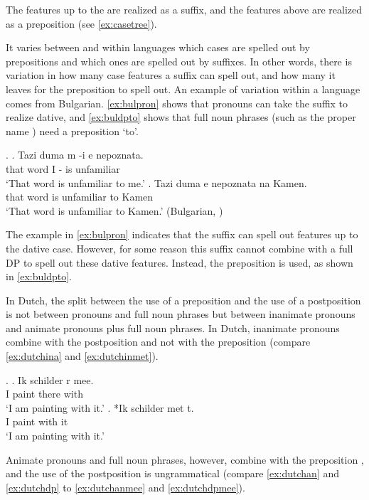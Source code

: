 \documentclass[11pt,a4paper]{article}
\begin{document}
The features up to the  are realized as a suffix, and the features above  are realized as a preposition (see \ref{ex:casetree}).

It varies between and within languages which cases are spelled out by prepositions and which ones are spelled out by suffixes. In other words, there is variation in how many case features a suffix can spell out, and how many it leaves for the preposition to spell out. An example of variation within a language comes from Bulgarian. \ref{ex:bulpron} shows that pronouns can take the suffix  to realize dative, and \ref{ex:buldpto} shows that full noun phrases (such as the proper name ) need a preposition  `to'.

\ex.\label{ex:bulgarian}
\ag. Tazi duma m -i e nepoznata.\\
that word I - is unfamiliar\\
`That word is unfamiliar to me.'\label{ex:bulpron}
\bg. Tazi duma e nepoznata na Kamen.\\
that word is unfamiliar to Kamen\\
`That word is unfamiliar to Kamen.'\label{ex:buldpto} \hfill (Bulgarian, \citealt[39]{caha2009})

The example in \ref{ex:bulpron} indicates that the suffix  can spell out features up to the dative case. However, for some reason this suffix cannot combine with a full DP to spell out these dative features. Instead, the preposition  is used, as shown in \ref{ex:buldpto}.

In Dutch, the split between the use of a preposition and the use of a postposition is not between pronouns and full noun phrases but between inanimate pronouns and animate pronouns plus full noun phrases. In Dutch, inanimate pronouns combine with the postposition  and not with the preposition  (compare \ref{ex:dutchina} and \ref{ex:dutchinmet}).

\ex.
\ag. Ik schilder r mee.\\
 I paint there with\\
 `I am painting with it.'\label{ex:dutchina}
\bg. *Ik schilder met t.\\
 I paint with it\\
 `I am painting with it.'\label{ex:dutchinmet}

Animate pronouns and full noun phrases, however, combine with the preposition , and the use of the postposition  is ungrammatical (compare \ref{ex:dutchan} and \ref{ex:dutchdp} to \ref{ex:dutchanmee} and \ref{ex:dutchdpmee}).
\end{document}

